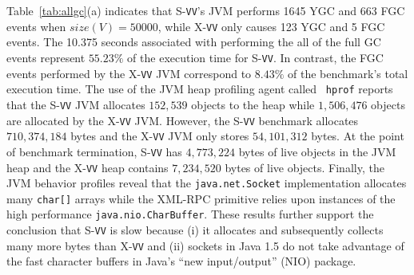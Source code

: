 \documentclass{sig-alternate}
\begin{document}
Table~\ref{tab:allgc}(a) indicates that S-{\tt VV}'s JVM performs 1645
YGC and 663 FGC events when $size(V)=50000$, while X-{\tt VV} only
causes 123 YGC and 5 FGC events.  The 10.375 seconds associated with
performing the all of the full GC events represent $55.23\%$ of the
execution time for S-{\tt VV}.  In contrast, the FGC events performed
by the X-{\tt VV} JVM correspond to $8.43\%$ of the benchmark's total
execution time.  The use of the JVM heap profiling agent called {\tt
  hprof} reports that the S-{\tt VV} JVM allocates $152,539$ objects
to the heap while $1,506,476$ objects are allocated by the X-{\tt VV}
JVM.  However, the S-{\tt VV} benchmark allocates $710,374,184$ bytes
and the X-{\tt VV} JVM only stores $54,101,312$ bytes.  At the point
of benchmark termination, S-{\tt VV} has $4,773,224$ bytes of live
objects in the JVM heap and the X-{\tt VV} heap contains $7,234,520$
bytes of live objects.  Finally, the JVM behavior profiles reveal that
the {\tt java.net.Socket} implementation allocates many {\tt char[]}
arrays while the XML-RPC primitive relies upon instances of the high
performance {\tt java.nio.CharBuffer}.  These results further support
the conclusion that S-{\tt VV} is slow because (i) it allocates and
subsequently collects many more bytes than X-{\tt VV} and (ii) sockets
in Java 1.5 do not take advantage of the fast character buffers in
Java's ``new input/output'' (NIO) package.
\end{document}
